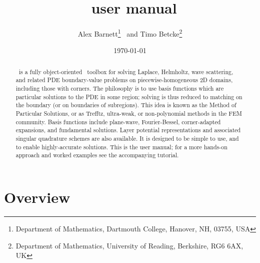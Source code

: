\documentclass[12pt]{article}
\begin{document}
\title{\mpspack\ user manual}
\author{Alex Barnett\footnote{Department of Mathematics, Dartmouth College, Hanover, NH, 03755, USA}
\ and Timo Betcke\footnote{Department of Mathematics,
University of Reading, Berkshire, RG6 6AX, UK}}
\date{\today}   %

\maketitle
\begin{abstract}
\mpspack\ is a fully object-oriented \matlab\ toolbox for
solving Laplace, Helmholtz, wave scattering, and related PDE boundary-value
problems
on piecewise-homogeneous 2D domains, including those with corners.
The philosophy is to
use basis functions
which are particular solutions to the
PDE in some region; solving is thus reduced to matching on
the boundary (or on boundaries of subregions).
This idea is known as the Method of Particular Solutions, or as Trefftz,
ultra-weak, or non-polynomial 
methods in the FEM community.
Basis functions include plane-wave, Fourier-Bessel,
corner-adapted expansions, and
fundamental solutions.
Layer potential representations and associated
singular quadrature schemes are also available.
It is designed to
be simple to use, and to enable highly-accurate solutions.  This is
the user manual; for a more hands-on approach and worked examples
see the accompanying tutorial.
\end{abstract}


\bfi %
\efi


\section{Overview}
\label{s:overview}
\end{document}
